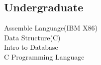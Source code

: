 \documentclass[a4paper]{lyu-resume} %
\begin{document}
\begin{minipage}[t]{0.33\textwidth}
\subsection{Undergraduate}

Assemble Language(IBM X86) \\
Data Structure(C) \\
Intro to Database \\
C Programming Language

\sectionspace %


\end{minipage} %
\hfill
%
%
\end{document}

